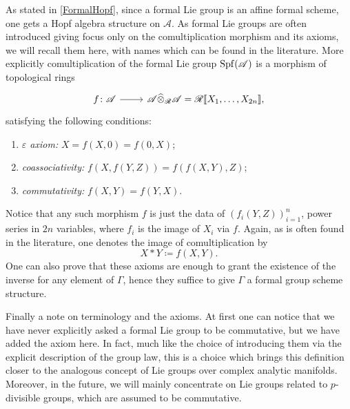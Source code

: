 \begin{rem}[]
	As stated in \cref{FormalHopf}, since a formal Lie group
	is an affine formal scheme, one gets a Hopf algebra structure
	on $\mathscr{A}$.
	As formal Lie groups are often introduced giving focus only
	on the comultiplication morphism and its axioms, we will
	recall them here, with names which can be found in the literature.
	More explicitly comultiplication of the formal Lie group
	$\operatorname{Spf}(\mathscr{A})$ is a morphism of topological rings
	\begin{equation*}
	\begin{tikzcd}[row sep = 0ex
		,/tikz/column 1/.append style={anchor=base east}
		,/tikz/column 2/.append style={anchor=base west}]
		f\colon \mathscr{A} \arrow[r, "", rightarrow] &
		\mathscr{A} \widehat{\otimes}_{\mathscr{R}} \mathscr{A} =
		\mathscr{R} [\![ X_1, \ldots, X_{ 2n } ]\!]
	,\end{tikzcd}
	\end{equation*} 
	satisfying the following conditions:
	\begin{enumerate}
		\item \emph{$\varepsilon$ axiom:} $X = f(X,0) = f(0,X)$;
		\item \emph{coassociativity:} $f(X, f(Y,Z)) = f(f(X,Y), Z)$;
		\item \emph{commutativity:} $f(X,Y) = f(Y,X)$.
	\end{enumerate}
	Notice that any such morphism $f$ is just the data of 
	$\left( f_i(Y,Z) \right)_{i=1}^n$, power series in $2n$ variables, where
	$f_i$ is the image of $X_i$ via $f$.
	Again, as is often found in the literature, one denotes the image of
	comultiplication by
	\begin{equation*}
		X \ast Y \coloneqq f(X,Y)
	.\end{equation*} 
	One can also prove that these axioms are enough to grant
	the existence of the inverse for any element of $\Gamma$,
	hence they suffice to give $\Gamma$ a formal group scheme structure.

	Finally a note on terminology and the axioms.
	At first one can notice that we have never explicitly asked 
	a formal Lie group to be commutative, but we have added the axiom here.
	In fact, much like the choice of introducing them via the explicit description
	of the group law, this is a choice which brings this definition
	closer to the analogous concept of Lie groups over complex analytic manifolds.
	Moreover, in the future, we will mainly concentrate on Lie groups related to
	$p$-divisible groups, which are assumed to be commutative.
\end{rem}


